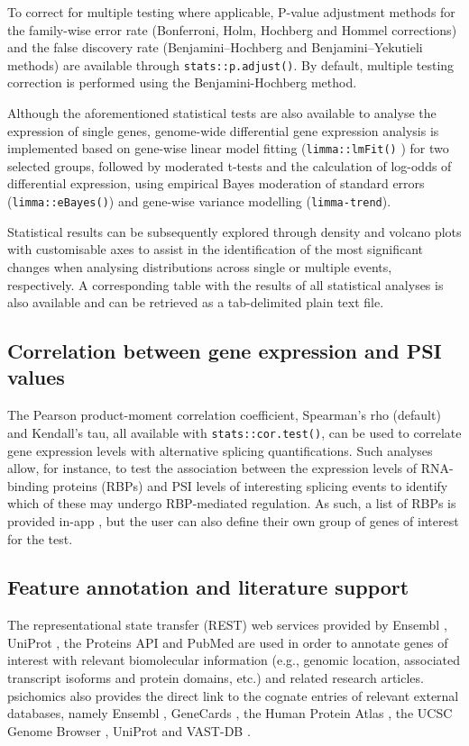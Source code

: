 To correct for multiple testing where applicable, P-value adjustment methods for the family-wise error rate (Bonferroni, Holm, Hochberg and Hommel corrections) and the false discovery rate (Benjamini–Hochberg and Benjamini–Yekutieli methods) are available through \texttt{stats::p.adjust()}. By default, multiple testing correction is performed using the Benjamini-Hochberg method.

Although the aforementioned statistical tests are also available to analyse the expression of single genes, genome-wide differential gene expression analysis is implemented based on gene-wise linear model fitting (\texttt{limma::lmFit()} \cite{ritchie:2015tm}) for two selected groups, followed by moderated t-tests and the calculation of log-odds of differential expression, using empirical Bayes moderation of standard errors (\texttt{limma::eBayes()}) and gene-wise variance modelling (\texttt{limma-trend}).

Statistical results can be subsequently explored through density and volcano plots with customisable axes to assist in the identification of the most significant changes when analysing distributions across single or multiple events, respectively. A corresponding table with the results of all statistical analyses is also available and can be retrieved as a tab-delimited plain text file.

\subsection{Correlation between gene expression and PSI values}

The Pearson product-moment correlation coefficient, Spearman's rho (default) and Kendall's tau, all available with \texttt{stats::cor.test()}, can be used to correlate gene expression levels with alternative splicing quantifications. Such analyses allow, for instance, to test the association between the expression levels of RNA-binding proteins (RBPs) and PSI levels of interesting splicing events to identify which of these may undergo RBP-mediated regulation. As such, a list of RBPs is provided in-app \cite{sebestyen:2016tr}, but the user can also define their own group of genes of interest for the test.

\subsection{Feature annotation and literature support}

The representational state transfer (REST) web services provided by Ensembl \cite{yates:2015uo}, UniProt \cite{wu:2006vq}, the Proteins API \cite{nightingale:2017uq} and PubMed \cite{roberts:2001tg} are used in order to annotate genes of interest with relevant biomolecular information (e.g., genomic location, associated transcript isoforms and protein domains, etc.) and related research articles. psichomics also provides the direct link to the cognate entries of relevant external databases, namely Ensembl \cite{cunningham:2015wt}, GeneCards \cite{fishilevich:2016wh}, the Human Protein Atlas \cite{uhlen:2015tg}, the UCSC Genome Browser \cite{goldman:2015un}, UniProt \cite{wu:2006vq} and VAST-DB \cite{tapial:2017ui}.


